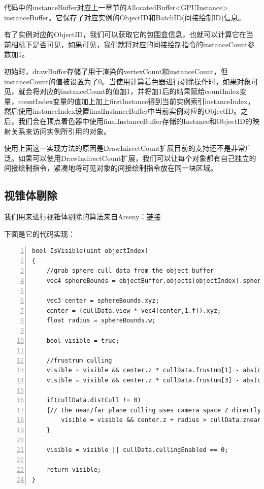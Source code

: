 \documentclass{ctexart}
\begin{document}
代码中的instanceBuffer对应上一章节的AllocatedBuffer<GPUInstance> instanceBuffer。它保存了对应实例的ObjectID和BatchID(间接绘制ID)信息。

有了实例对应的ObjectID，我们可以获取它的包围盒信息，也就可以计算它在当前相机下是否可见，如果可见，我们就将对应的间接绘制指令的instanceCount参数加1。

初始时，drawBuffer存储了用于渲染的vertexCount和instanceCount，但instanceCount的值被设置为了0。当使用计算着色器进行剔除操作时，如果对象可见，就会将对应的instanceCount的值加1，并将加1后的结果赋给countIndex变量，countIndex变量的值加上加上firstInstance得到当前实例索引instanceIndex，然后使用instanceIndex设置finalInstanceBuffer中当前实例对应的ObjectID。之后，我们会在顶点着色器中使用finalInstanceBuffer存储的Instance和ObjectID的映射关系来访问实例所引用的对象。

使用上面这一实现方法的原因是DrawInirectCount扩展目前的支持还不是非常广泛。如果可以使用DrawIndirectCount扩展，我们可以让每个对象都有自己独立的间接绘制指令，紧凑地将可见对象的间接绘制指令放在同一块区域。

\subsection{视锥体剔除}

我们用来进行视锥体剔除的算法来自Arseny：\href{https://github.com/zeux/niagara}{链接}

下面是它的代码实现：

\begin{lstlisting}[language={[ANSI]C},keywordstyle=\color{blue!70},commentstyle=\color{red!50!green!50!blue!50},frame=shadowbox, rulesepcolor=\color{red!20!green!20!blue!20},basicstyle=\small,numbers=left, numberstyle=\tiny,breaklines=true]
bool IsVisible(uint objectIndex)
{
	//grab sphere cull data from the object buffer
	vec4 sphereBounds = objectBuffer.objects[objectIndex].spherebounds;

	vec3 center = sphereBounds.xyz;
	center = (cullData.view * vec4(center,1.f)).xyz;
	float radius = sphereBounds.w;

	bool visible = true;

	//frustrum culling
	visible = visible && center.z * cullData.frustum[1] - abs(center.x) * cullData.frustum[0] > -radius;
	visible = visible && center.z * cullData.frustum[3] - abs(center.y) * cullData.frustum[2] > -radius;

	if(cullData.distCull != 0)
	{// the near/far plane culling uses camera space Z directly
		visible = visible && center.z + radius > cullData.znear && center.z - radius < cullData.zfar;
	}

	visible = visible || cullData.cullingEnabled == 0;

	return visible;
}
\end{lstlisting}
\end{document}
